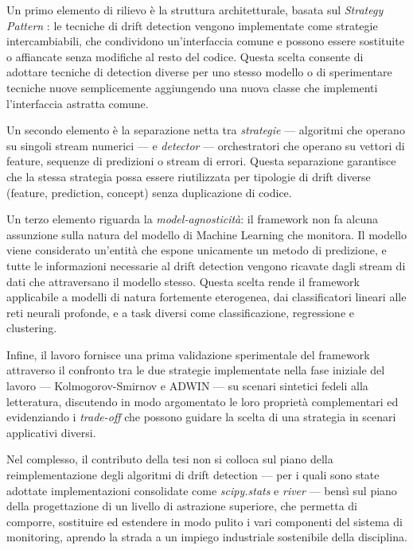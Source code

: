 Un primo elemento di rilievo è la struttura architetturale, basata sul
\textit{Strategy Pattern} \cite{gof1994patterns}: le tecniche di drift
detection vengono implementate come strategie intercambiabili, che condividono
un'interfaccia comune e possono essere sostituite o affiancate senza modifiche
al resto del codice. Questa scelta consente di adottare tecniche di detection
diverse per uno stesso modello o di sperimentare tecniche nuove semplicemente
aggiungendo una nuova classe che implementi l'interfaccia astratta comune.

Un secondo elemento è la separazione netta tra \textit{strategie} — algoritmi
che operano su singoli stream numerici — e \textit{detector} — orchestratori
che operano su vettori di feature, sequenze di predizioni o stream di errori.
Questa separazione garantisce che la stessa strategia possa essere riutilizzata
per tipologie di drift diverse (feature, prediction, concept) senza
duplicazione di codice.

Un terzo elemento riguarda la \textit{model-agnosticità}: il framework non fa
alcuna assunzione sulla natura del modello di Machine Learning che monitora.
Il modello viene considerato un'entità che espone unicamente un metodo di
predizione, e tutte le informazioni necessarie al drift detection vengono
ricavate dagli stream di dati che attraversano il modello stesso. Questa scelta
rende il framework applicabile a modelli di natura fortemente eterogenea, dai
classificatori lineari alle reti neurali profonde, e a task diversi come
classificazione, regressione e clustering.

Infine, il lavoro fornisce una prima validazione sperimentale del framework
attraverso il confronto tra le due strategie implementate nella fase iniziale
del lavoro — Kolmogorov-Smirnov e ADWIN — su scenari sintetici fedeli alla
letteratura, discutendo in modo argomentato le loro proprietà complementari
ed evidenziando i \textit{trade-off} che possono guidare la scelta di una
strategia in scenari applicativi diversi.

Nel complesso, il contributo della tesi non si colloca sul piano della
reimplementazione degli algoritmi di drift detection — per i quali sono state
adottate implementazioni consolidate come \textit{scipy.stats} \cite{scipy2020}
e \textit{river} \cite{montiel2021river} — bensì sul piano della progettazione
di un livello di astrazione superiore, che permetta di comporre, sostituire ed
estendere in modo pulito i vari componenti del sistema di monitoring, aprendo
la strada a un impiego industriale sostenibile della disciplina.



